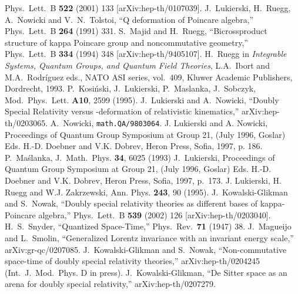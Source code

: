 \documentclass[a4paper,a4paper]{article}
\begin{document}
\begin{thebibliography}{99}
Phys.\ Lett.\ B {\bf 522} (2001) 133
[arXiv:hep-th/0107039].
 J.~Lukierski, H.~Ruegg, A.~Nowicki and V.~N.~Tolstoi,
``Q deformation of Poincare algebra,''
Phys.\ Lett.\ B {\bf 264} (1991) 331.
 S.~Majid and H.~Ruegg,
``Bicrossproduct structure of kappa Poincare group and noncommutative geometry,''
Phys.\ Lett.\ B {\bf 334} (1994) 348
[arXiv:hep-th/9405107].
 H.~Ruegg in {\em Integrable Systems, Quantum Groups, and Quantum Field Theories}, L.A.~Ibort and M.A.~Rodr\'iguez eds., NATO ASI series, vol.~409, Kluwer Academic Publishers, Dordrecht, 1993.
 P.~Kosi\'nski, J.~Lukierski, P.~Maslanka, J.~Sobczyk, Mod.~Phys.~Lett. {\bf A10}, 2599 (1995).
 J.~Lukierski and A.~Nowicki,
``Doubly Special Relativity versus \myHighlight{$\kappa$}\coordHE{}-deformation of relativistic kinematics,''
arXiv:hep-th/0203065.
  A.~Nowicki, {\tt math.QA/9803064}.
 J. Lukierski and A. Nowicki, Proceedings of
Quantum Group Symposium at Group 21, (July 1996, Goslar) Eds.
H.-D. Doebner and V.K. Dobrev, Heron Press, Sofia, 1997, p. 186.
 P.~Ma\'slanka, J.~Math.~Phys. {\bf 34}, 6025 (1993)
 J.~Lukierski, Proceedings of
Quantum Group Symposium at Group 21, (July 1996, Goslar) Eds.
H.-D. Doebner and V.K. Dobrev, Heron Press, Sofia, 1997, p.~173.
 J. Lukierski, H. Ruegg and W.J. Zakrzewski, Ann.
Phys. {\bf 243}, 90 (1995).
 J.~Kowalski-Glikman and S.~Nowak,
``Doubly special relativity theories as different bases of kappa-Poincare  algebra,''
Phys.\ Lett.\ B {\bf 539} (2002) 126
[arXiv:hep-th/0203040].
 H.~S.~Snyder,
``Quantized Space-Time,''
Phys.\ Rev.\  {\bf 71} (1947) 38.
J.~Magueijo and L.~Smolin,
``Generalized Lorentz invariance with an invariant energy scale,''
arXiv:gr-qc/0207085.
J.~Kowalski-Glikman and S.~Nowak,
``Non-commutative space-time of doubly special relativity theories,''
arXiv:hep-th/0204245 (Int.~J.~Mod.~Phys. D in press).  
J.~Kowalski-Glikman,
``De Sitter space as an arena for doubly special relativity,''
arXiv:hep-th/0207279.
\end{thebibliography}
\end{document}

